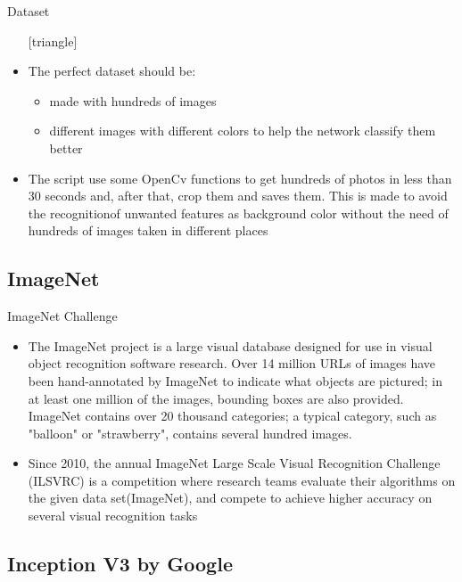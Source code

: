\documentclass{beamer}
\begin{document}
\begin{frame}{Dataset}
\begin{itemize}
\setlength\itemsep{1em}
[triangle]
\item The perfect dataset should be:
\begin{itemize}
[circle]
\item made with hundreds of images
\item different images with different colors to help the network classify them better
\end{itemize}
\item The script use some OpenCv functions to get hundreds of photos in less than 30 seconds and, after that, crop them and saves them. This is made to avoid the recognitionof unwanted features as background color without the need of hundreds of images taken in different places
\end{itemize}
\end{frame}

\subsection{ImageNet}

\begin{frame}{ImageNet Challenge}
\begin{itemize}
\setlength\itemsep{1em}
[triangle]
\item The ImageNet project is a large visual database designed for use in visual object recognition software research. Over 14 million URLs of images have been hand-annotated by ImageNet to indicate what objects are pictured; in at least one million of the images, bounding boxes are also provided. ImageNet contains over 20 thousand categories; a typical category, such as "balloon" or "strawberry", contains several hundred images.
\item Since 2010, the annual ImageNet Large Scale Visual Recognition Challenge (ILSVRC) is a competition where research teams evaluate their algorithms on the given data set(ImageNet), and compete to achieve higher accuracy on several visual recognition tasks
\end{itemize}
\end{frame}

\subsection{Inception V3 by Google}
\end{document}
